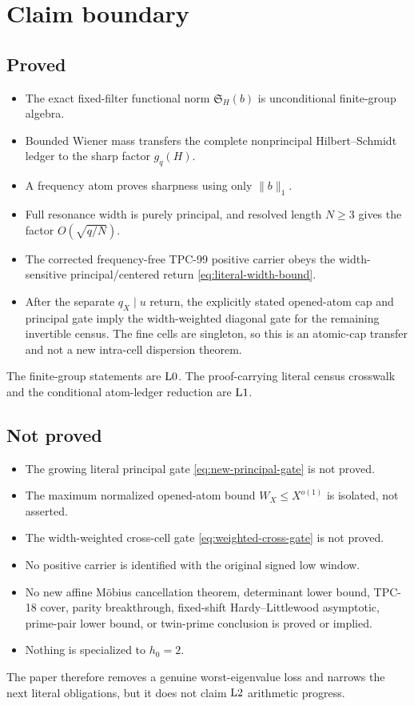 \section{Claim boundary}
\label{sec:claim-boundary}

\subsection*{Proved}

\begin{itemize}[leftmargin=2em]
\item The exact fixed-filter functional norm
  \(\mathfrak S_H(b)\) is unconditional finite-group algebra.
\item Bounded Wiener mass transfers the complete nonprincipal
  Hilbert--Schmidt ledger to the sharp factor \(g_q(H)\).
\item A frequency atom proves sharpness using only \(\|b\|_1\).
\item Full resonance width is purely principal, and resolved length
  \(N\ge3\) gives the factor \(O(\sqrt{q/N})\).
\item The corrected frequency-free TPC-99 positive carrier obeys
  the width-sensitive principal/centered return
  \eqref{eq:literal-width-bound}.
\item After the separate \(q_X\mid u\) return, the explicitly stated
  opened-atom cap and principal gate imply the width-weighted
  diagonal gate for the remaining invertible census.  The fine
  cells are singleton, so this is an atomic-cap transfer and not a
  new intra-cell dispersion theorem.
\end{itemize}

The finite-group statements are \(\mathrm{L0}\).  The proof-carrying
literal census crosswalk and the conditional atom-ledger reduction
are \(\mathrm{L1}\).

\subsection*{Not proved}

\begin{itemize}[leftmargin=2em]
\item The growing literal principal gate
  \eqref{eq:new-principal-gate} is not proved.
\item The maximum normalized opened-atom bound
  \(W_X\le X^{o(1)}\) is isolated, not asserted.
\item The width-weighted cross-cell gate
  \eqref{eq:weighted-cross-gate} is not proved.
\item No positive carrier is identified with the original signed
  low window.
\item No new affine M\"obius cancellation theorem, determinant
  lower bound, TPC-18 cover, parity breakthrough, fixed-shift
  Hardy--Littlewood asymptotic, prime-pair lower bound, or
  twin-prime conclusion is proved or implied.
\item Nothing is specialized to \(h_0=2\).
\end{itemize}

The paper therefore removes a genuine worst-eigenvalue loss and
narrows the next literal obligations, but it does not claim
\(\mathrm{L2}\) arithmetic progress.
